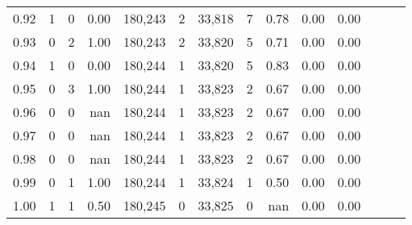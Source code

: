 \begin{tabular}{rrrrrrrrrrrrrr}
0.92 &      1 &      0 &  0.00 &  180,243 &        2 &  33,818 &       7 &  0.78 &  0.00 &      0.00 \\
0.93 &      0 &      2 &  1.00 &  180,243 &        2 &  33,820 &       5 &  0.71 &  0.00 &      0.00 \\
0.94 &      1 &      0 &  0.00 &  180,244 &        1 &  33,820 &       5 &  0.83 &  0.00 &      0.00 \\
0.95 &      0 &      3 &  1.00 &  180,244 &        1 &  33,823 &       2 &  0.67 &  0.00 &      0.00 \\
0.96 &      0 &      0 &   nan &  180,244 &        1 &  33,823 &       2 &  0.67 &  0.00 &      0.00 \\
0.97 &      0 &      0 &   nan &  180,244 &        1 &  33,823 &       2 &  0.67 &  0.00 &      0.00 \\
0.98 &      0 &      0 &   nan &  180,244 &        1 &  33,823 &       2 &  0.67 &  0.00 &      0.00 \\
0.99 &      0 &      1 &  1.00 &  180,244 &        1 &  33,824 &       1 &  0.50 &  0.00 &      0.00 \\
1.00 &      1 &      1 &  0.50 &  180,245 &        0 &  33,825 &       0 &   nan &  0.00 &      0.00 \\
\bottomrule
\end{tabular}
